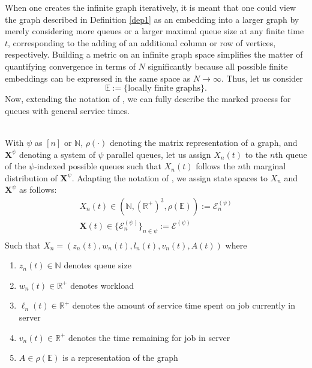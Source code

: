 When one creates the infinite graph iteratively, it is meant that one could view the graph described in Definition \ref{dep1} as an embedding into a larger graph by merely considering more queues or a larger maximal queue size at any finite time $t$, corresponding to the adding of an additional column or row of vertices, respectively. Building a metric on an infinite graph space simplifies the matter of quantifying convergence in terms of $N$ significantly because all possible finite embeddings can be expressed in the same space as $N\rightarrow \infty$. Thus, let us consider \[\mathbb{E}:= \{\text{locally finite graphs}\}.\] Now, extending the notation of \cite{bramson_asymptotic_2012}, we can fully describe the marked process for queues with general service times.
\begin{definition}
    \hfill \\
    With $\psi$ as $[n]$ or $\mathbb{N}$, $\rho(\cdot)$ denoting the matrix representation of a graph, and $\mathbf{X}^{\psi}$ denoting a system of $\psi$ parallel queues,
    let us assign $X_{n}(t)$ to the $n$th queue of the $\psi$-indexed possible queues such that $X_{n}(t)$ follows the $n$th marginal distribution of $\mathbf{X}^{\psi}$.
    Adapting the notation of \cite{bramson_asymptotic_2012}, we assign state spaces to $X_{n}$ and $\mathbf{X}^{\psi}$ as follows:
    \begin{gather*}
        X_{n}(t)\in (\mathbb{N},\left(\mathbb{R}^{+}\right)^{3},\rho(\mathbb{E})):=\mathcal{E}^{(\psi)}_{n}\\
        \mathbf{X}(t) \in \{\mathcal{E}^{(\psi)}_{n}\}_{n \in \psi} := \mathcal{E}^{(\psi)}\\
    \end{gather*}
    Such that $X_{n} = (z_{n}(t), w_{n}(t),l_{n}(t),v_{n}(t),A(t))$ where
    \begin{enumerate}
        \item $z_{n}(t) \in \mathbb{N}$ denotes queue size
        \item $ w_{n}(t) \in \mathbb{R}^{+}$ denotes workload
        \item $\ell_{n}(t) \in \mathbb{R}^{+}$ denotes the amount of service time spent on job currently in server
        \item $v_{n}(t) \in \mathbb{R}^{+}$ denotes the time remaining for job in server
        \item $A \in \rho(\mathbb{E})$ is a representation of the graph
    \end{enumerate}
    \label{def:spec}
\end{definition}


